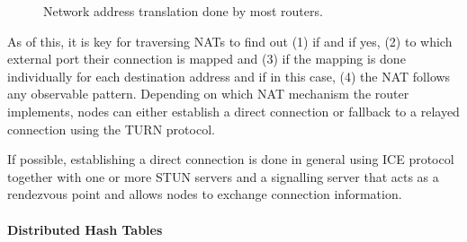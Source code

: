 \begin{figure}[H]
      \label{fig:successful-nat-traversal}
      \caption{Network address translation done by most routers.}
\end{figure}

As of this, it is key for traversing NATs to find out (1) if and if yes, (2) to which external port their connection is mapped and (3) if the mapping is done individually for each destination address and if in this case, (4) the NAT follows any observable pattern. Depending on which NAT mechanism the router implements, nodes can either establish a direct connection or fallback to a relayed connection using the TURN protocol.

If possible, establishing a direct connection is done in general using ICE protocol together with one or more STUN servers and a signalling server that acts as a rendezvous point and allows nodes to exchange connection information.

\paragraph{Distributed Hash Tables}


